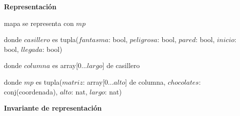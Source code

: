 \documentclass{book}
\begin{document}
    \textbf{Representación}

    mapa se representa con $mp$


    donde $casillero$ es tupla($fantasma$: bool, $peligrosa$: bool, $pared$: bool, $inicio$: bool, $llegada$: bool)

    donde $columna$ es array[0...$largo$] de casillero

    donde $mp$ es tupla($matriz$: array[0...$alto$] de columna, $chocolates$: conj(coordenada), $alto$: nat, $largo$: nat)

    \textbf{Invariante de representación}

\end{document}
